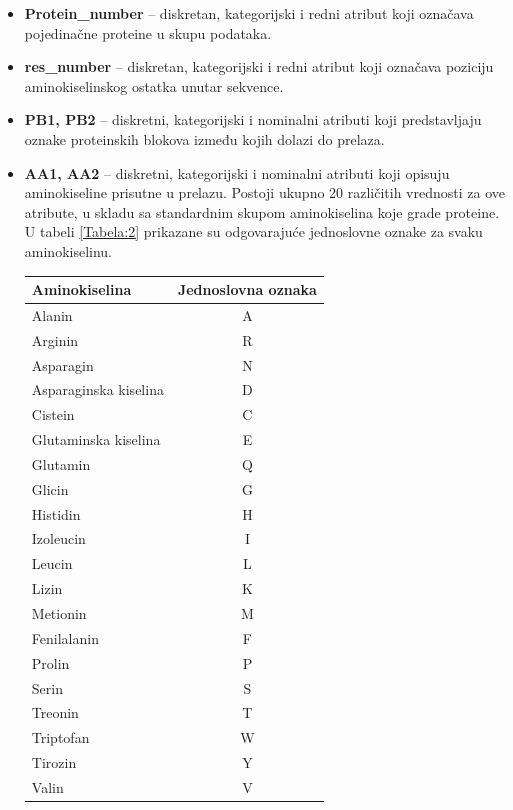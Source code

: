 \documentclass[a4paper,12pt]{article}
\begin{document}
\begin{itemize}
    \item \textbf{Protein\_number} – diskretan, kategorijski i redni atribut koji označava pojedinačne proteine u skupu podataka.
    \item \textbf{res\_number} – diskretan, kategorijski i redni atribut koji označava poziciju aminokiselinskog ostatka unutar sekvence.
    \item \textbf{PB1, PB2} – diskretni, kategorijski i nominalni atributi koji predstavljaju oznake proteinskih blokova između kojih dolazi do prelaza.
    \item \textbf{AA1, AA2} – diskretni, kategorijski i nominalni atributi koji opisuju aminokiseline prisutne u prelazu. Postoji ukupno 20 različitih vrednosti za ove atribute, u skladu sa standardnim skupom aminokiselina koje grade proteine. U tabeli \ref{Tabela:2} prikazane su odgovarajuće jednoslovne oznake za svaku aminokiselinu.
\begin{table}[h!]
    \centering
	\begin{tabular}{ |l|c| } 
	\hline
	\textbf{Aminokiselina} &  \textbf{Jednoslovna oznaka}\\
	\hline
	Alanin &	 A \\
	\hline
	Arginin 	& R 	\\
	\hline
	Asparagin &	N \\
	\hline
	Asparaginska kiselina & D \\
	\hline
	Cistein 	& C 	\\
	\hline
	Glutaminska kiselina & E \\
	\hline
	Glutamin & Q \\
	\hline
	Glicin & G \\
	\hline
	Histidin & H \\
	\hline
	Izoleucin & I \\
	\hline
	Leucin & L \\
	\hline
	Lizin &	K \\
	\hline
	Metionin & M \\
	\hline
	Fenilalanin & F \\
	\hline
	Prolin & P \\
	\hline
	Serin & S \\
	\hline
	Treonin 	& T \\
	\hline
	Triptofan & W \\
	\hline
	Tirozin 	& Y \\
	\hline
	Valin & V  \\
	\hline
	\end{tabular}

\end{table}
\end{itemize}
\end{document}
